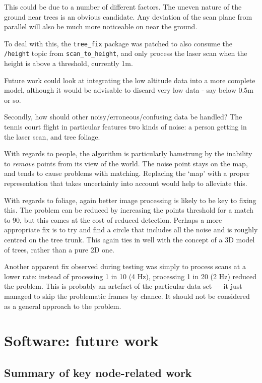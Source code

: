 \documentclass[12pt,oneside,a4paper]{book}
\begin{document}
This could be due to a number of different factors. The uneven nature
of the ground near trees is an obvious candidate. Any deviation of the
scan plane from parallel will also be much more noticeable on near the
ground.

To deal with this, the \texttt{tree\_fix} package was patched to also
consume the \texttt{/height} topic from \texttt{scan\_to\_height}, and
only process the laser scan when the height is above a threshold,
currently 1m.

Future work could look at integrating the low altitude data into a
more complete model, although it would be advisable to discard very
low data - say below 0.5m or so.

Secondly, how should other noisy/erroneous/confusing data be handled? The tennis court
flight in particular features two kinds of noise: a person getting in
the laser scan, and tree foliage.

With regards to people, the algorithm is particularly hamstrung by the
inability to \emph{remove} points from its view of the world. The
noise point stays on the map, and tends to cause problems with
matching. Replacing the `map' with a proper representation that takes
uncertainty into account would help to alleviate this.

With regards to foliage, again better image processing is likely to
be key to fixing this. The problem can be reduced by increasing the
points threshold for a match to 90, but this comes at the cost of
reduced detection. Perhaps a more appropriate fix is to try and find a
circle that includes all the noise and is roughly centred on the tree
trunk. This again ties in well with the concept of a 3D model of trees,
rather than a pure 2D one.

Another apparent fix observed during testing was simply to process
scans at a lower rate: instead of processing 1 in 10 (4 Hz),
processing 1 in 20 (2 Hz) reduced the problem. This is probably an
artefact of the particular data set --- it just managed to skip the
problematic frames by chance. It should not be considered as a
general approach to the problem.

\section{Software: future work}
\label{sec:softw-future-work}

\subsection{Summary of key node-related work}
\label{sec:summary-key-node}
\end{document}
